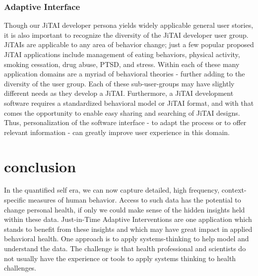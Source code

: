 \documentclass{sigchi}
\begin{document}
\subsubsection{Adaptive Interface}
Though our JiTAI developer persona yields widely applicable general user stories, it is also important to recognize the diversity of the JiTAI developer user group.
JiTAIs are applicable to any area of behavior change; just a few popular proposed JiTAI applications include management of eating behaviors, physical activity, smoking cessation, drug abuse, PTSD, and stress.
Within each of these many application domains are a myriad of behavioral theories - further adding to the diversity of the user group.
Each of these sub-user-groups may have slightly different needs as they develop a JiTAI.
Furthermore, a JiTAI development software requires a standardized behavioral model or JiTAI format, and with that comes the opportunity to enable easy sharing and searching of JiTAI designs.
Thus, personalization of the software interface - to adapt the process or to offer relevant information\cite{kay2012creating} - can greatly improve user experience in this domain.

\section{conclusion}
In the quantified self era, we can now capture detailed, high frequency, context-specific measures of human behavior. 
Access to such data has the potential to change personal health, if only we could make sense of the hidden insights held within these data. 
Just-in-Time Adaptive Interventions are one application which stands to benefit from these insights and which may have great impact in applied behavioral health.
One approach is to apply systems-thinking to help model and understand the data.
The challenge is that health professional and scientists do not usually have the experience or tools to apply systems thinking to health challenges.
\end{document}
